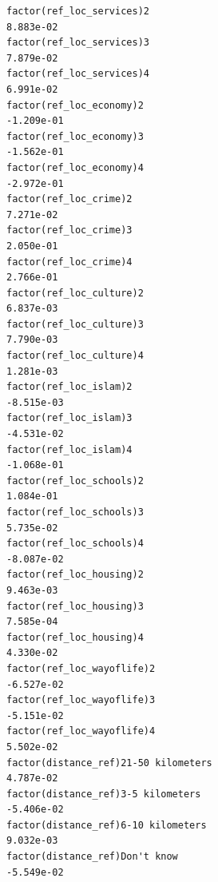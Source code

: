 \documentclass[
]{article}
\begin{document}
\begin{table}
\begin{minipage}[t]{\linewidth}
{\begin{verbatim}
factor(ref_loc_services)2                                                          8.883e-02
factor(ref_loc_services)3                                                          7.879e-02
factor(ref_loc_services)4                                                          6.991e-02
factor(ref_loc_economy)2                                                          -1.209e-01
factor(ref_loc_economy)3                                                          -1.562e-01
factor(ref_loc_economy)4                                                          -2.972e-01
factor(ref_loc_crime)2                                                             7.271e-02
factor(ref_loc_crime)3                                                             2.050e-01
factor(ref_loc_crime)4                                                             2.766e-01
factor(ref_loc_culture)2                                                           6.837e-03
factor(ref_loc_culture)3                                                           7.790e-03
factor(ref_loc_culture)4                                                           1.281e-03
factor(ref_loc_islam)2                                                            -8.515e-03
factor(ref_loc_islam)3                                                            -4.531e-02
factor(ref_loc_islam)4                                                            -1.068e-01
factor(ref_loc_schools)2                                                           1.084e-01
factor(ref_loc_schools)3                                                           5.735e-02
factor(ref_loc_schools)4                                                          -8.087e-02
factor(ref_loc_housing)2                                                           9.463e-03
factor(ref_loc_housing)3                                                           7.585e-04
factor(ref_loc_housing)4                                                           4.330e-02
factor(ref_loc_wayoflife)2                                                        -6.527e-02
factor(ref_loc_wayoflife)3                                                        -5.151e-02
factor(ref_loc_wayoflife)4                                                         5.502e-02
factor(distance_ref)21-50 kilometers                                               4.787e-02
factor(distance_ref)3-5 kilometers                                                -5.406e-02
factor(distance_ref)6-10 kilometers                                                9.032e-03
factor(distance_ref)Don't know                                                    -5.549e-02

\end{verbatim}}
\end{minipage}
\end{table}
\end{document}
